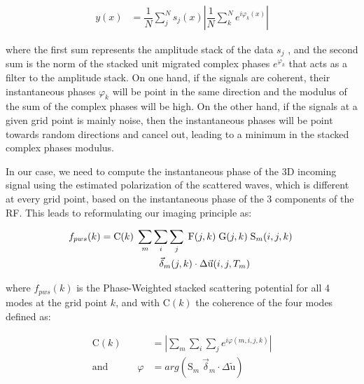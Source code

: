 \documentclass[10pt,a4paper]{article}
\numberwithin{equation}{section}
\begin{document}
\begin{align}
  y(x) &= \dfrac{1}{N} \sum_j^N s_j(x) \left\vert \dfrac{1}{N} \sum_k^N e^{i\varphi_k(x)} \right\vert
  \label{pws_1}
\end{align}
\vspace{1mm}

\noindent where the first sum represents the amplitude stack of the data $s_j$ , and the second sum is the norm of the stacked unit migrated complex phases $e^{\varphi_k}$ that acts as a filter to the amplitude stack.
On one hand, if the signals are coherent, their instantaneous phases $\varphi_k$ will be point in the same direction and the modulus of the sum of the complex phases will be high.
On the other hand, if the signals at a given grid point is mainly noise, then the instantaneous phases will be point towards random directions and cancel out, leading to a minimum in the stacked complex phases modulus.

In our case, we need to compute the instantaneous phase of the 3D incoming signal using the estimated polarization of the scattered waves, which is different at every grid point, based on the instantaneous phase of the 3 components of the RF.
This leads to reformulating our imaging principle as:

\begin{align}
  f_{pws}(k) &= \text{C}(k) \; \sum_m \sum_i \sum_j \; \text{F}(j,k) \; \text{G}(j,k) \; \text{S}_{m}(i,j,k) \; \notag\\&\qquad\qquad\qquad \vec{\delta}_{m}(j,k) \cdot \Delta\vec{\text{u}}(i,j,T_m)
  \label{pws}
\end{align}
\vspace{1mm}

\noindent where $f_{pws}(k)$ is the Phase-Weighted stacked scattering potential for all 4 modes at the grid point $k$, and with C$(k)$ the coherence of the four modes defined as:

\begin{align}
  \text{C}(k) &= \left\vert \sum_m \sum_i \sum_j e^{i\varphi(m,i,j,k)} \right\vert
  \label{coh}
\\
  \text{and} \quad \qquad \varphi &= arg( \text{S}_m \; \vec{\delta}_m \cdot \Delta\tilde{\text{u}})
  \label{arg}
\end{align}
\vspace{1mm}
\end{document}
